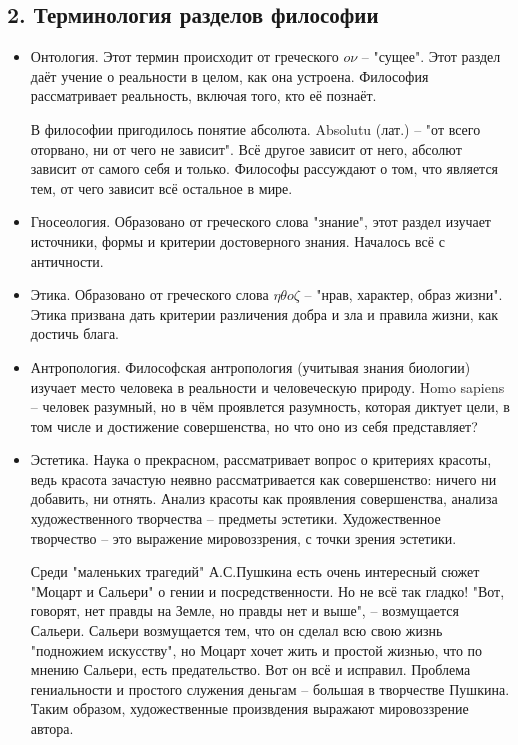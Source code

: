 \documentclass[a4paper, 12pt]{book} %
\begin{document}
\subsection*{2. Терминология разделов философии}
\begin{itemize}
\item Онтология.
Этот термин происходит от греческого $o \nu$ -- "сущее". Этот раздел даёт учение о реальности в целом, как она устроена. Философия рассматривает реальность, включая того, кто её познаёт.
 
В философии пригодилось понятие абсолюта. Absolutu (лат.) -- "от всего оторвано, ни от чего не зависит". Всё другое зависит от него, абсолют зависит от самого себя и  только. Философы рассуждают о том, что является тем, от чего зависит всё остальное в мире.

\item Гносеология. Образовано от греческого слова "знание", этот раздел изучает источники, формы и критерии достоверного знания. Началось всё с античности. 

\item Этика. Образовано от греческого слова $\eta \theta o \zeta$ -- "нрав, характер, образ жизни". Этика призвана дать критерии различения добра и зла и правила жизни, как достичь блага.

\item Антропология. Философская антропология (учитывая знания биологии) изучает место человека в реальности и человеческую природу. Homo sapiens -- человек разумный, но в чём проявлется разумность, которая диктует цели, в том числе и достижение совершенства, но что оно из себя представляет?

\item Эстетика. Наука о прекрасном, рассматривает вопрос о критериях красоты, ведь красота зачастую неявно рассматривается как совершенство: ничего ни добавить, ни отнять. Анализ красоты как проявления совершенства, анализа художественного творчества -- предметы эстетики. Художественное творчество -- это выражение мировоззрения, с точки зрения эстетики. 	

Среди "маленьких трагедий" А.С.Пушкина есть очень интересный сюжет "Моцарт и Сальери" о гении и посредственности. Но не всё так гладко! "Вот, говорят, нет правды на Земле,  но правды нет и выше", -- возмущается Сальери. Сальери возмущается тем, что он сделал всю свою жизнь "подножием искусству", но Моцарт хочет жить и простой жизнью, что по мнению Сальери, есть предательство. Вот он всё и исправил. Проблема гениальности и простого служения деньгам -- большая в творчестве Пушкина. Таким образом, художественные произвдения выражают мировоззрение автора.


\end{itemize}
\end{document}
